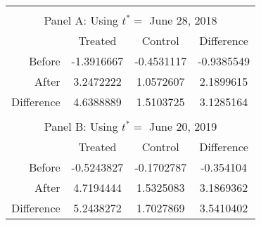 

\begin{tabular}{r|ccc}
    \toprule \multicolumn{4}{c}{}\\
    \multicolumn{4}{c}{Panel A: Using \(t^* = \) June 28, 2018} \\[1em]
             &           Treated                    &  Control                          &  Difference\\ \cmidrule(r){1-4}
    Before    & -1.3916667       &  -0.4531117   &  -0.9385549 \\
    After     & 3.2472222       &  1.0572607   &  2.1899615 \\
    Difference & 4.6388889 & 1.5103725 & 3.1285164 \\ \midrule\multicolumn{4}{c}{}\\

    \multicolumn{4}{c}{Panel B: Using \(t^* = \) June 20, 2019} \\[1em]
             &           Treated                    &  Control                          &  Difference\\ \cmidrule(r){1-4}
    Before    & -0.5243827       &  -0.1702787   &  -0.354104 \\
    After     & 4.7194444       &  1.5325083   &  3.1869362 \\
    Difference & 5.2438272 & 1.7027869 & 3.5410402 \\ \bottomrule
\end{tabular}
